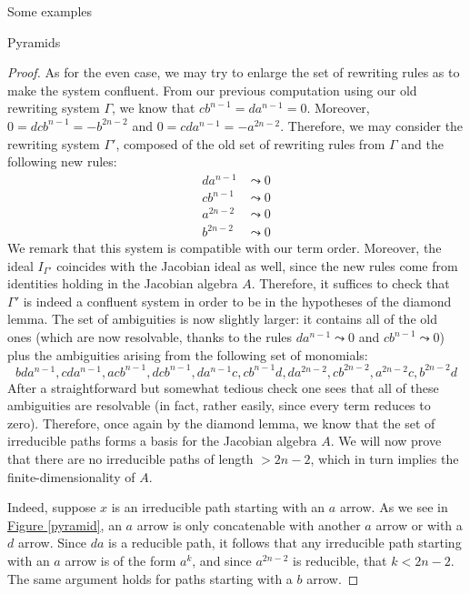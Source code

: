 \begin{chapter}{Some examples}
\begin{section}{Pyramids}
\begin{proof}
As for the even case, we may try to enlarge the set of rewriting rules as to make the system confluent. From our previous computation using our old rewriting system $\Gamma$, we know that $cb^{n-1}=da^{n-1}=0$. Moreover,  $0=dcb^{n-1}=-b^{2n-2}$ and  $0=cda^{n-1}=-a^{2n-2}$. Therefore, we may consider the rewriting system $\Gamma'$, composed of the old set of rewriting rules from $\Gamma$ and the following new rules:
\begin{align*}
da^{n-1} &\leadsto 0 \\
cb^{n-1} &\leadsto 0\\
a^{2n-2} &\leadsto 0\\
b^{2n-2} &\leadsto 0
\end{align*}
We remark that this system is compatible with our term order. Moreover, the ideal $I_{\Gamma'}$ coincides with the Jacobian ideal as well, since the new rules come from identities holding in the Jacobian algebra $A$. Therefore, it suffices to check that $\Gamma'$ is indeed a confluent system in order to be in the hypotheses of the diamond lemma. The set of ambiguities is now slightly larger: it contains all of the old ones (which are now resolvable, thanks to the rules $da^{n-1} \leadsto 0$ and $cb^{n-1} \leadsto 0$) plus the ambiguities arising from the following set of monomials:
\[bda^{n-1}, cda^{n-1}, acb^{n-1}, dcb^{n-1}, da^{n-1}c, cb^{n-1}d, da^{2n-2}, cb^{2n-2}, a^{2n-2}c, b^{2n-2}d\]
After a straightforward but somewhat tedious check one sees that all of these ambiguities are resolvable (in fact, rather easily, since every term reduces to zero). Therefore, once again by the diamond lemma, we know that the set of irreducible paths forms a basis for the Jacobian algebra $A$. We will now prove that there are no irreducible paths of length $>2n-2$, which in turn implies the finite-dimensionality of $A$.

Indeed, suppose $x$ is an irreducible path starting with an $a$ arrow. As we see in \hyperref[pyramid]{Figure \ref*{pyramid}}, an $a$ arrow is only concatenable with another $a$ arrow or with a $d$ arrow. Since $da$ is a reducible path, it follows that any irreducible path starting with an $a$ arrow is of the form $a^k$, and since $a^{2n-2}$ is reducible, that $k<2n-2$. The same argument holds for paths starting with a $b$ arrow.


\end{proof}
\end{section}
\end{chapter}
